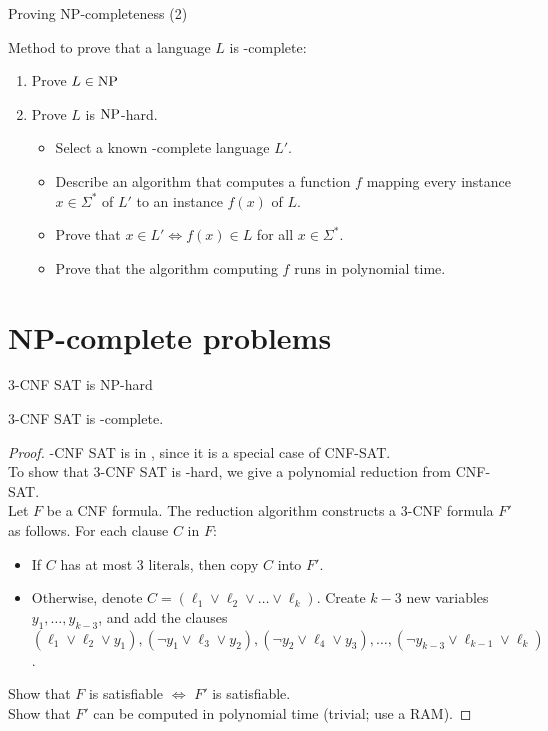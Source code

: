 \begin{frame}{Proving NP-completeness (2)}

	Method to prove that a language $L$ is \NP-complete:
	\begin{enumerate}
		\item Prove $L \in \text{\normalfont {NP}}$
		\item Prove $L$ is $\text{\normalfont {NP}}$-hard.
		      \begin{itemize}
			      \item Select a known \NP-complete language $L'$.
			      \item Describe an algorithm that computes a function $f$ mapping every instance $x\in \Sigma^*$ of $L'$ to an instance $f(x)$ of $L$.
			      \item Prove that $x\in L' \Leftrightarrow f(x)\in L$ for all $x\in \Sigma^*$.
			      \item Prove that the algorithm computing $f$ runs in polynomial time.
		      \end{itemize}
	\end{enumerate}
\end{frame}

\section{NP-complete problems}

\begin{frame}{3-CNF SAT is NP-hard}

	\begin{theorem}
		3-CNF SAT is \NP-complete.
	\end{theorem}
	\begin{proof}
		-CNF SAT is in \NP, since it is a special case of CNF-SAT.\\
		\pause
		To show that 3-CNF SAT is \NP-hard, we give a polynomial reduction from CNF-SAT.\\
		\pause
		Let $F$ be a CNF formula. The reduction algorithm constructs a 3-CNF formula $F'$ as follows. For each clause $C$ in $F$:
		\begin{itemize}
			\item If $C$ has at most 3 literals, then copy $C$ into $F'$.
			\item Otherwise,
			      denote $C = (\ell_1 \vee \ell_2 \vee \dots \vee \ell_k)$.
			      \pause
			      Create $k-3$ new variables $y_1,\dots,y_{k-3}$, and add the clauses $(\ell_1 \vee \ell_2 \vee y_1), (\neg y_1 \vee \ell_3 \vee y_2), (\neg y_2 \vee \ell_4 \vee y_3), \dots, (\neg y_{k-3} \vee \ell_{k-1} \vee\ell_k)$.
		\end{itemize}
		\pause
		Show that $F$ is satisfiable $\Leftrightarrow$ $F'$ is satisfiable.\\
		Show that $F'$ can be computed in polynomial time (trivial; use a RAM).
	\end{proof}

\end{frame}


